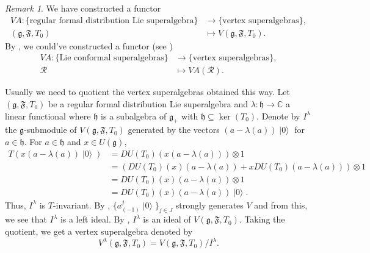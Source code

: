 \documentclass[a4paper, 12pt, reqno]{amsart}
\theoremstyle{remark}
\newtheorem{remark}[theorem]{Remark}
\numberwithin{equation}{subsection}
\DeclareMathOperator{\vac}{|0\rangle}
\begin{document}
\begin{remark}
  \label{rmk:15}
  We have constructed a functor
  \begin{align*}
    VA: \{\text{regular formal distribution Lie superalgebra}\} &\to \{\text{vertex superalgebras}\}, \\
    (\mathfrak{g}, \mathfrak{F}, T_0) &\mapsto V(\mathfrak{g}, \mathfrak{F}, T_0).
  \end{align*}
  By , we could've constructed a functor (see \cite[Theorem 2.15]{li_vertex_2004})
  \begin{align*}
    VA: \{\text{Lie conformal superalgebras}\} &\to \{\text{vertex superalgebras}\}, \\
    \mathcal{R} &\mapsto VA(\mathcal{R}).
  \end{align*}
\end{remark}

Usually we need to quotient the vertex superalgebras obtained this way.
Let $(\mathfrak{g}, \mathfrak{F}, T_0)$ be a regular formal distribution Lie superalgebra and $\lambda: \mathfrak{h} \to \mathbb{C}$ a linear functional where $\mathfrak{h}$ is a subalgebra of $\mathfrak{g}_+$ with $\mathfrak{h} \subseteq \ker(T_0)$.
Denote by $I^{\lambda}$ the $\mathfrak{g}$-submodule of $V(\mathfrak{g}, \mathfrak{F}, T_0)$ generated by the vectors $(a - \lambda(a))\vac$ for $a \in \mathfrak{h}$.
For $a \in \mathfrak{h}$ and $x \in U(\mathfrak{g})$,
\begin{align*}
  T(x(a - \lambda(a))\vac) &= DU(T_0)(x(a - \lambda(a)))\otimes1 \\
  &= (DU(T_0)(x)(a - \lambda(a)) + xDU(T_0)(a - \lambda(a)))\otimes1 \\
  &= DU(T_0)(x)(a - \lambda(a))\otimes1 \\
  &= DU(T_0)(x)(a - \lambda(a))\vac.
\end{align*}
Thus, $I^{\lambda}$ is $T$-invariant.
By , $\{a^j_{(-1)}\vac\}_{j \in J}$ strongly generates $V$ and from this, we see that $I^{\lambda}$ is a left ideal.
By , $I^{\lambda}$ is an ideal of $V(\mathfrak{g}, \mathfrak{F}, T_0)$.
Taking the quotient, we get a vertex superalgebra denoted by
\begin{equation*}
  V^{\lambda}(\mathfrak{g}, \mathfrak{F}, T_0) = V(\mathfrak{g}, \mathfrak{F}, T_0)/I^{\lambda}.
\end{equation*}
\end{document}

